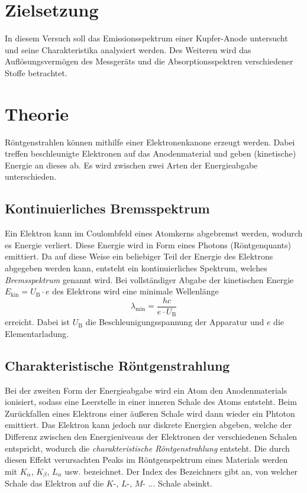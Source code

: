 \section{Zielsetzung}
\label{sec:Ziel}
In diesem Versuch soll das Emissionsspektrum einer Kupfer-Anode untersucht und seine Charakteristika analysiert werden. Des Weiteren wird das Auflösungsvermögen
des Messgeräts und die Absorptionsspektren verschiedener Stoffe betrachtet. 

\section{Theorie}
\label{sec:Theorie}
Röntgenstrahlen können mithilfe einer Elektronenkanone erzeugt werden. Dabei treffen beschleunigte Elektronen auf das Anodenmaterial und geben (kinetische)
Energie an dieses ab. Es wird zwischen zwei Arten der Energieabgabe unterschieden.

\subsection{Kontinuierliches Bremsspektrum}
\label{subsec:Bremsspektrum}
Ein Elektron kann im Coulombfeld eines Atomkerns abgebremst werden,
wodurch es Energie verliert. Diese Energie wird in Form eines Photons (Röntgenquants) emittiert. Da auf diese Weise ein beliebiger Teil der Energie des
Elektrons abgegeben werden kann, entsteht ein kontinuierliches Spektrum, welches \textit{Bremsspektrum} genannt wird.
Bei vollständiger Abgabe der kinetischen Energie $E_\text{kin} = U_\text{B} \cdot e$ des Elektrons wird eine minimale Wellenlänge
\begin{equation}
    \label{eqn:lambda_min}
    \lambda_\text{min} = \frac{h c}{e \cdot U_\text{B}}
\end{equation}
erreicht. Dabei ist $U_\text{B}$ die Beschleunigungsspannung der Apparatur und $e$ die Elementarladung. 

\subsection{Charakteristische Röntgenstrahlung} 
\label{subsec:Bremsspektrum}
Bei der zweiten Form der Energieabgabe wird ein Atom den Anodenmaterials ionisiert, sodass eine Leerstelle in einer inneren Schale des Atoms entsteht. 
Beim Zurückfallen eines Elektrons einer äußeren Schale wird dann wieder ein Phtoton emittiert. Das Elektron kann jedoch nur diskrete Energien abgeben,
welche der Differenz zwischen den Energieniveaus der Elektronen der verschiedenen Schalen entspricht, wodurch die \textit{charakteristische Röntgenstrahlung}
entsteht. Die durch diesen Effekt verursachten Peaks im Röntgenspektrum eines Materials werden mit $K_\alpha$, $K_\beta$, $L_\alpha$ usw. bezeichnet.
Der Index des Bezeichners gibt an, von welcher Schale das Elektron auf die $K$-, $L$-, $M$- ... Schale absinkt.

